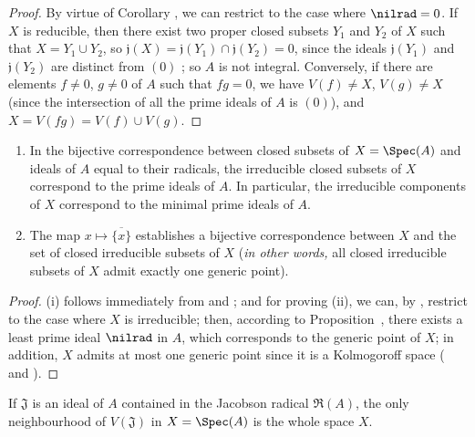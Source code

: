 \begin{proof}
By virtue of Corollary , we can restrict to the case where $\nilrad=0$.
If $X$ is reducible, then there exist two proper closed subsets $Y_1$ and $Y_2$ of $X$ such that $X=Y_1\cup Y_2$, so $\mathfrak{j}(X)=\mathfrak{j}(Y_1)\cap\mathfrak{j}(Y_2)=0$, since the ideals $\mathfrak{j}(Y_1)$ and $\mathfrak{j}(Y_2)$ are distinct from $(0)$ ;
so $A$ is not integral.
Conversely, if there are elements $f\neq 0$, $g\neq 0$ of $A$ such that $fg=0$, we have $V(f)\neq X$, $V(g)\neq X$ (since the intersection of all the prime ideals of $A$ is $(0)$), and $X=V(fg)=V(f)\cup V(g)$.
\end{proof}

\begin{corollary}[1.1.14]
\label{I.1.1.14}
\medskip\noindent
\begin{enumerate}
  \item[{\rm(i)}] In the bijective correspondence between closed subsets of $X=\Spec(A)$ and ideals of $A$ equal to their radicals, the irreducible closed subsets of $X$ correspond to the prime ideals of $A$.
    In particular, the irreducible components of $X$ correspond to the minimal prime ideals of $A$.
  \item[{\rm(ii)}] The map $x\mapsto\overline{\{x\}}$ establishes a bijective correspondence between $X$ and the set of closed irreducible subsets of $X$ (\emph{in other words,} all closed irreducible subsets of $X$ admit exactly one generic point).
\end{enumerate}
\end{corollary}

\begin{proof}
(i) follows immediately from  and ;
and for proving (ii), we can, by , restrict to the case where $X$ is irreducible;
then, according to Proposition~, there exists a least prime ideal $\nilrad$ in $A$, which corresponds to the generic point
of $X$;
in addition, $X$ admits at most one generic point since it is a Kolmogoroff space ( and ).
\end{proof}

\begin{proposition}[1.1.15]
\label{I.1.1.15}
If $\mathfrak{J}$ is an ideal of $A$ contained in the Jacobson radical $\mathfrak{R}(A)$, the only
neighbourhood of $V(\mathfrak{J})$ in $X=\Spec(A)$ is the whole space $X$.
\end{proposition}

